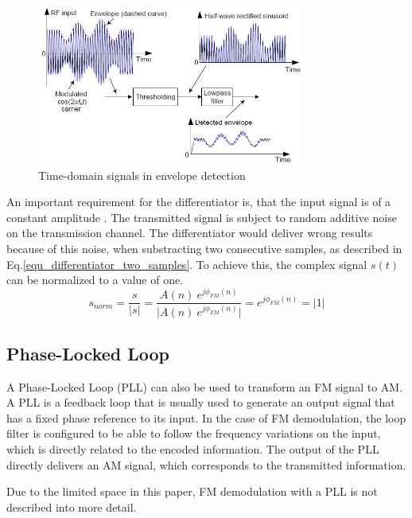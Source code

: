 \documentclass[conference]{IEEEtran}
\begin{document}
    \begin{figure}[!h]
      \centering
        \includegraphics[width=8.8cm]{img/envelope-detect-time-domain.jpg}
      \caption{Time-domain signals in envelope detection \cite{ref_roppel}}
      \label{fig_time_domain_envelope_detect}
    \end{figure}

    An important requirement for the differentiator is, that the input signal is of a constant amplitude \cite{ref_schnyder_haller}.
    The transmitted signal is subject to random additive noise on the transmission channel.
    The differentiator would deliver wrong results because of this noise, when substracting two consecutive samples, as described in Eq.\ref{equ_differentiator_two_samples}.
    To achieve this, the complex signal $s(t)$ can be normalized to a value of one.
    \begin{equation}
      s_{norm} = \frac{s}{|s|} = \frac{A(n)\ e^{j\phi_{FM}(n)}}{|{A(n)\ e^{j\phi_{FM}(n)}|}} = e^{j\phi_{FM}(n)} = |1|
    \end{equation}



  \subsection{Phase-Locked Loop}
    A Phase-Locked Loop (PLL) can also be used to transform an FM signal to AM.
    A PLL is a feedback loop that is usually used to generate an output signal that has a fixed phase reference to its input.
    In the case of FM demodulation, the loop filter is configured to be able to follow the frequency variations on the input, which is directly related to the encoded information.
    The output of the PLL directly delivers an AM signal, which corresponds to the transmitted information. \cite{ref_schnyder_haller}

    Due to the limited space in this paper, FM demodulation with a PLL is not described into more detail.
\end{document}
